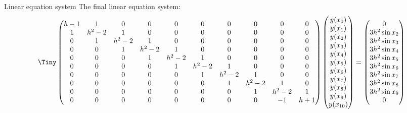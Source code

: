 \documentclass{beamer}
\begin{document}
	\begin{frame}{Linear equation system}
		The final linear equation system: 
		\begin{equation*}
		\Tiny
			\begin{pmatrix}
				h-1 & 1 & 0 & 0 & 0 & 0 & 0 & 0 & 0 & 0\\
				1 & h^2 - 2 & 1 & 0 & 0 & 0 & 0 & 0 & 0 & 0\\
				0 & 1 & h^2 - 2 & 1 & 0 & 0 & 0 & 0 & 0 & 0\\
				0 & 0 & 1 & h^2 - 2 & 1 & 0 & 0 & 0 & 0 & 0\\
				0 & 0 & 0 & 1 & h^2 - 2 & 1 & 0 & 0 & 0 & 0\\
				0 & 0 & 0 & 0 & 1 & h^2 - 2 & 1 & 0 & 0 & 0\\
				0 & 0 & 0 & 0 & 0 & 1 & h^2 - 2 & 1 & 0 & 0\\
				0 & 0 & 0 & 0 & 0 & 0 & 1 & h^2 - 2 & 1 & 0\\
				0 & 0 & 0 & 0 & 0 & 0 & 0 & 1 & h^2 - 2 & 1\\
				0 & 0 & 0 & 0 & 0 & 0 & 0 & 0 & -1 & h+1\\
			\end{pmatrix}
			\begin{pmatrix}
				y(x_0)\\
				y(x_1)\\
				y(x_2)\\
				y(x_3)\\
				y(x_4)\\
				y(x_5)\\
				y(x_6)\\
				y(x_7)\\
				y(x_8)\\
				y(x_9)\\
				y(x_{10})
			\end{pmatrix} = 
			\begin{pmatrix}
				0\\
				3h^2\sin x_2\\
				3h^2\sin x_3\\
				3h^2\sin x_4\\
				3h^2\sin x_5\\
				3h^2\sin x_6\\
				3h^2\sin x_7\\
				3h^2\sin x_8\\
				3h^2\sin x_9\\
				0
			\end{pmatrix}
		\end{equation*}
	\end{frame}
	
\end{document}
